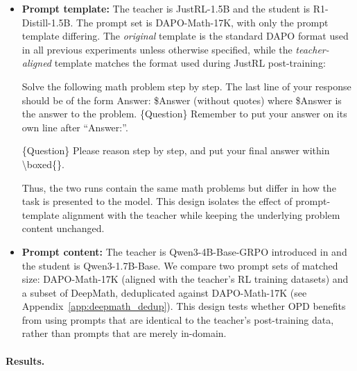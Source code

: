 \begin{itemize}[leftmargin=12pt]
    \item \textbf{Prompt template:} The teacher is JustRL-1.5B and the student is R1-Distill-1.5B. The prompt set is DAPO-Math-17K, with only the prompt template differing. The \emph{original} template is the standard DAPO format used in all previous experiments unless otherwise specified, while the \emph{teacher-aligned} template matches the format used during JustRL post-training:

\begin{tcolorbox}[title=\textbf{Original DAPO Template},colback=Salmon!20, colframe=Salmon!90!Black]
\small
Solve the following math problem step by step. The last line of your response should be of the form Answer: \$Answer (without quotes) where \$Answer is the answer to the problem. \{Question\} Remember to put your answer on its own line after ``Answer:''.
\end{tcolorbox}

\begin{tcolorbox}[title=\textbf{Teacher-Aligned Template}, colback=CornflowerBlue!20, colframe=CornflowerBlue!90!Black]
\small
\{Question\} Please reason step by step, and put your final answer within \textbackslash boxed\{\}.
\end{tcolorbox}

    Thus, the two runs contain the same math problems but differ in how the task is presented to the model. This design isolates the effect of prompt-template alignment with the teacher while keeping the underlying problem content unchanged.

    \item \textbf{Prompt content:} The teacher is Qwen3-4B-Base-GRPO introduced in  and the student is Qwen3-1.7B-Base. We compare two prompt sets of matched size: DAPO-Math-17K (aligned with the teacher's RL training datasets) and a subset of DeepMath, deduplicated against DAPO-Math-17K (see Appendix~\ref{app:deepmath_dedup}). This design tests whether OPD benefits from using prompts that are identical to the teacher's post-training data, rather than prompts that are merely in-domain.
\end{itemize}





\paragraph{Results.}

